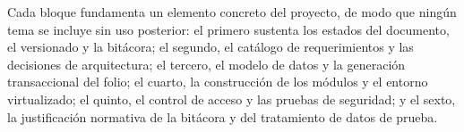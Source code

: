 Cada bloque fundamenta un elemento concreto del proyecto, de modo que ningún tema se incluye sin uso posterior: el primero sustenta los estados del documento, el versionado y la bitácora; el segundo, el catálogo de requerimientos y las decisiones de arquitectura; el tercero, el modelo de datos y la generación transaccional del folio; el cuarto, la construcción de los módulos y el entorno virtualizado; el quinto, el control de acceso y las pruebas de seguridad; y el sexto, la justificación normativa de la bitácora y del tratamiento de datos de prueba.

